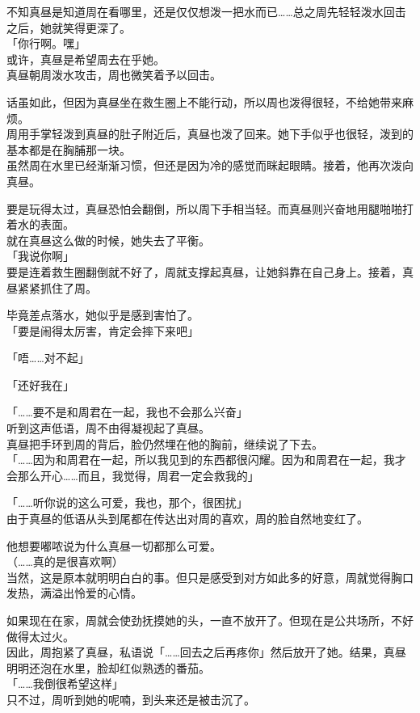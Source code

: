 不知真昼是知道周在看哪里，还是仅仅想泼一把水而已……总之周先轻轻泼水回击之后，她就笑得更深了。\\

「你行啊。嘿」\\

或许，真昼是希望周去在乎她。\\

真昼朝周泼水攻击，周也微笑着予以回击。

话虽如此，但因为真昼坐在救生圈上不能行动，所以周也泼得很轻，不给她带来麻烦。\\

周用手掌轻泼到真昼的肚子附近后，真昼也泼了回来。她下手似乎也很轻，泼到的基本都是在胸脯那一块。\\

虽然周在水里已经渐渐习惯，但还是因为冷的感觉而眯起眼睛。接着，他再次泼向真昼。

要是玩得太过，真昼恐怕会翻倒，所以周下手相当轻。而真昼则兴奋地用腿啪啪打着水的表面。\\

就在真昼这么做的时候，她失去了平衡。\\

「我说你啊」\\

要是连着救生圈翻倒就不好了，周就支撑起真昼，让她斜靠在自己身上。接着，真昼紧紧抓住了周。

毕竟差点落水，她似乎是感到害怕了。\\

「要是闹得太厉害，肯定会摔下来吧」

「唔……对不起」

「还好我在」

「……要不是和周君在一起，我也不会那么兴奋」\\

听到这声低语，周不由得凝视起了真昼。\\

真昼把手环到周的背后，脸仍然埋在他的胸前，继续说了下去。\\

「……因为和周君在一起，所以我见到的东西都很闪耀。因为和周君在一起，我才会那么开心……而且，我觉得，周君一定会救我的」

「……听你说的这么可爱，我也，那个，很困扰」\\

由于真昼的低语从头到尾都在传达出对周的喜欢，周的脸自然地变红了。

他想要嘟哝说为什么真昼一切都那么可爱。\\

（……真的是很喜欢啊）\\

当然，这是原本就明明白白的事。但只是感受到对方如此多的好意，周就觉得胸口发热，满溢出怜爱的心情。

如果现在在家，周就会使劲抚摸她的头，一直不放开了。但现在是公共场所，不好做得太过火。\\

因此，周抱紧了真昼，私语说「……回去之后再疼你」然后放开了她。结果，真昼明明还泡在水里，脸却红似熟透的番茄。\\

「……我倒很希望这样」\\

只不过，周听到她的呢喃，到头来还是被击沉了。
